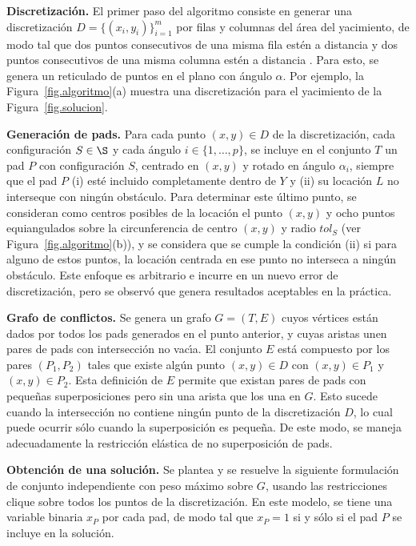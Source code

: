 \noindent\textbf{Discretizaci\'on.} El primer paso del algoritmo consiste en generar una discretizaci\'on $D=\{(x_i,y_i)\}_{i=1}^m$ por filas y columnas del \'area del yacimiento, de modo tal que dos puntos consecutivos de una misma fila est\'en a distancia y dos puntos consecutivos de una misma columna est\'en a distancia . Para esto, se genera un reticulado de puntos en el plano con \'angulo $\alpha$. Por ejemplo, la Figura~\ref{fig.algoritmo}(a) muestra una discretizaci\'on para el yacimiento de la Figura~\ref{fig.solucion}.

\noindent\textbf{Generaci\'on de pads.} Para cada punto $(x,y)\in D$ de la discretizaci\'on, cada configuraci\'on $S\in\S$ y cada \'angulo $i\in\{1,\dots,p\}$, se incluye en el conjunto $T$ un pad $P$ con configuraci\'on $S$, centrado en $(x,y)$ y rotado en \'angulo $\alpha_i$, siempre que el pad $P$ (i) est\'e incluido completamente dentro de $Y$ y (ii) su locaci\'on $L$ no interseque con ning\'un obst\'aculo. Para determinar este \'ultimo punto, se consideran como centros posibles de la locaci\'on el punto $(x,y)$ y ocho puntos equiangulados sobre la circunferencia de centro $(x,y)$ y radio $tol_S$ (ver Figura~\ref{fig.algoritmo}(b)), y se considera que se cumple la condici\'on (ii) si para alguno de estos puntos, la locaci\'on centrada en ese punto no interseca a ning\'un obst\'aculo. Este enfoque es arbitrario e incurre en un nuevo error de discretizaci\'on, pero se observ\'o que genera resultados aceptables en la pr\'actica.

\noindent\textbf{Grafo de conflictos.} Se genera un grafo $G=(T,E)$ cuyos v\'ertices est\'an dados por todos los pads generados en el punto anterior, y cuyas aristas unen pares de pads con intersecci\'on no vac\'\i a. El conjunto $E$ est\'a compuesto por los pares $(P_1,P_2)$ tales que existe alg\'un punto $(x,y)\in D$ con $(x,y)\in P_1$ y $(x,y)\in P_2$. Esta definici\'on de $E$ permite que existan pares de pads con peque\~nas superposiciones pero sin una arista que los una en $G$. Esto sucede cuando la intersecci\'on no contiene ning\'un punto de la discretizaci\'on $D$, lo cual puede ocurrir s\'olo cuando la superposici\'on es peque\~na. De este modo, se maneja adecuadamente la restricci\'on el\'astica de no superposici\'on de pads.

\noindent\textbf{Obtenci\'on de una soluci\'on.} Se plantea y se resuelve la siguiente formulaci\'on de conjunto independiente con peso m\'aximo sobre $G$, usando las restricciones clique sobre todos los puntos de la discretizaci\'on. En este modelo, se tiene una variable binaria $x_P$ por cada pad, de modo tal que $x_P=1$ si y s\'olo si el pad $P$ se incluye en la soluci\'on.

